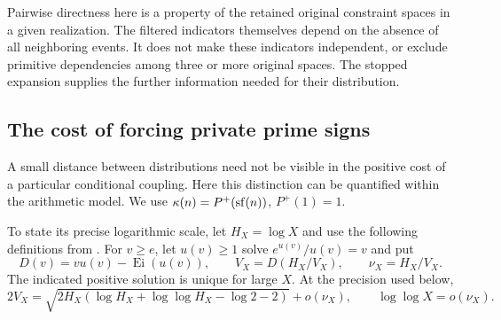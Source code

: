 Pairwise directness here is a property of the retained original
constraint spaces in a given realization.  The filtered
indicators themselves depend on the absence of all neighboring
events.  It does not make these indicators independent, or
exclude primitive dependencies among three or more original
spaces.  The stopped expansion supplies the further information
needed for their distribution.

\subsection{The cost of forcing private prime signs}

A small distance between distributions need not be visible in
the positive cost of a particular conditional coupling.  Here
this distinction can be quantified within the arithmetic model.
We use $\kappa(n)=P^+(\sf(n))$, $P^+(1)=1$.

To state its precise logarithmic scale, let $H_X=\log X$ and
use the following definitions from \cite[Proposition~4.2 and
Appendix~F.3]{pouly2026c}.  For $v\ge e$, let $u(v)\ge1$ solve
$e^{u(v)}/u(v)=v$ and put
\[
 D(v)=vu(v)-\operatorname{Ei}(u(v)),\qquad
 V_X=D(H_X/V_X),\qquad \nu_X=H_X/V_X.
\]
The indicated positive solution is unique for large $X$.
At the precision used below,
\begin{equation}
 2V_X=\sqrt{2H_X(\log H_X+\log\log H_X-\log2-2)}
          +o(\nu_X),\qquad
 \log\log X=o(\nu_X).
 \label{p1:limits:pivot-scale}
\end{equation}

